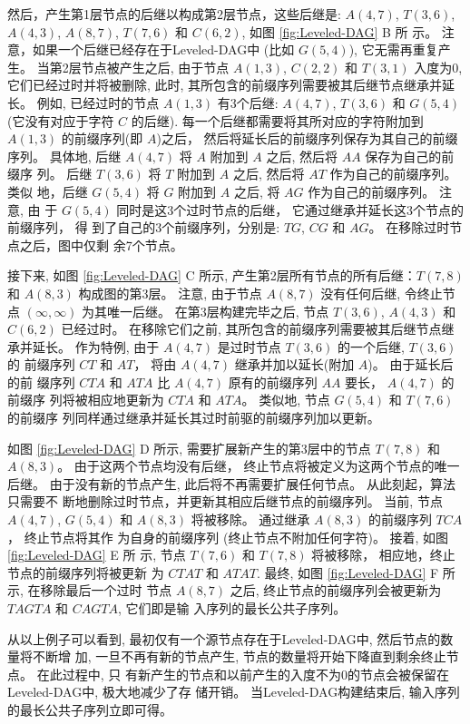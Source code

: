\documentclass[utf8]{frontiersSCNS} %
\begin{document}
然后，产生第1层节点的后继以构成第2层节点，这些后继是: $A(4, 7)$, $T(3, 6)$,
$A(4, 3)$, $A(8, 7)$, $T(7, 6)$ 和 $C(6, 2)$, 如图 \ref{fig:Leveled-DAG} B 所
示。 注意，如果一个后继已经存在于Leveled-DAG中 (比如 $G(5, 4)$), 它无需再重复产
生。 当第2层节点被产生之后, 由于节点 $A(1, 3)$, $C(2, 2)$ 和 $T(3, 1)$ 入度为0,
它们已经过时并将被删除, 此时, 其所包含的前缀序列需要被其后继节点继承并延
长。 例如, 已经过时的节点 $A(1, 3)$ 有3个后继: $A(4, 7)$, $T(3, 6)$ 和 $G(5, 4)$
(它没有对应于字符 $C$ 的后继). 每一个后继都需要将其所对应的字符附加到 $A(1, 3)$
的前缀序列(即 $A$)之后， 然后将延长后的前缀序列保存为其自己的前缀序列。 具体地,
后继 $A(4, 7)$ 将 $A$ 附加到 $A$ 之后, 然后将 $AA$ 保存为自己的前缀序
列。 后继 $T(3, 6)$ 将 $T$ 附加到 $A$ 之后, 然后将 $AT$ 作为自己的前缀序列。 类似
地，后继 $G(5, 4)$ 将 $G$ 附加到 $A$ 之后, 将 $AG$ 作为自己的前缀序列。 注意, 由
于 $G(5, 4)$ 同时是这3个过时节点的后继， 它通过继承并延长这3个节点的前缀序列， 得
到了自己的3个前缀序列，分别是: $TG$, $CG$ 和 $AG$。 在移除过时节点之后，图中仅剩
余7个节点。

接下来, 如图 \ref{fig:Leveled-DAG} C 所示, 产生第2层所有节点的所有后继：$T(7,
8)$ 和 $A(8, 3)$ 构成图的第3层。 注意, 由于节点 $A(8, 7)$ 没有任何后继, 令终止节
点 $(\infty, \infty)$ 为其唯一后继。 在第3层构建完毕之后, 节点 $T(3, 6)$, $A(4,
3)$ 和 $C(6, 2)$ 已经过时。 在移除它们之前, 其所包含的前缀序列需要被其后继节点继
承并延长。 作为特例, 由于 $A(4, 7)$ 是过时节点 $T(3, 6)$ 的一个后继, $T(3, 6)$ 的
前缀序列 $CT$ 和 $AT$， 将由 $A(4, 7)$ 继承并加以延长(附加 $A$)。 由于延长后的前
缀序列 $CTA$ 和 $ATA$ 比 $A(4, 7)$ 原有的前缀序列 $AA$ 要长， $A(4, 7)$ 的前缀序
列将被相应地更新为 $CTA$ 和 $ATA$。 类似地, 节点 $G(5, 4)$ 和 $T(7, 6)$ 的前缀序
列同样通过继承并延长其过时前驱的前缀序列加以更新。

如图 \ref{fig:Leveled-DAG} D 所示, 需要扩展新产生的第3层中的节点 $T(7,
8)$ 和 $A(8, 3)$。 由于这两个节点均没有后继， 终止节点将被定义为这两个节点的唯一
后继。 由于没有新的节点产生, 此后将不再需要扩展任何节点。 从此刻起，算法只需要不
断地删除过时节点，并更新其相应后继节点的前缀序列。 当前, 节点 $A(4, 7)$, $G(5,
4)$ 和 $A(8, 3)$ 将被移除。 通过继承 $A(8, 3)$ 的前缀序列 $TCA$， 终止节点将其作
为自身的前缀序列 (终止节点不附加任何字符)。 接着, 如图 \ref{fig:Leveled-DAG} E 所
示, 节点 $T(7, 6)$ 和 $T(7, 8)$ 将被移除， 相应地，终止节点的前缀序列将被更新
为 $CTAT$ 和 $ATAT$. 最终, 如图 \ref{fig:Leveled-DAG} F 所示, 在移除最后一个过时
节点 $A(8, 7)$ 之后, 终止节点的前缀序列会被更新为 $TAGTA$ 和 $CAGTA$, 它们即是输
入序列的最长公共子序列。

从以上例子可以看到, 最初仅有一个源节点存在于Leveled-DAG中, 然后节点的数量将不断增
加, 一旦不再有新的节点产生, 节点的数量将开始下降直到剩余终止节点。 在此过程中, 只
有新产生的节点和以前产生的入度不为0的节点会被保留在Leveled-DAG中, 极大地减少了存
储开销。 当Leveled-DAG构建结束后, 输入序列的最长公共子序列立即可得。
\end{document}
